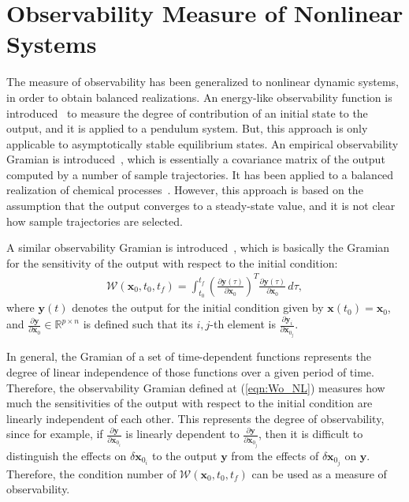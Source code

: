 \documentclass[letterpaper, preprint, paper,11pt]{AAS}	%
\newcommand{\parenth}[1]{\ensuremath{\left( #1 \right)}}
\newcommand{\refeqn}[1]{(\ref{eqn:#1})}
\newcommand{\deriv}[2]{\ensuremath{\frac{\partial #1}{\partial #2}}}
\renewcommand{\Re}{\ensuremath{\mathbb{R}}}
\newcommand{\x}{\ensuremath{\mathbf{x}}}
\newcommand{\y}{\mathbf{y}}
\begin{document}


\section{Observability Measure of Nonlinear Systems}

The measure of observability has been generalized to nonlinear dynamic systems, in order to obtain balanced realizations.
An energy-like observability function is introduced~\cite{SchSCL93,Sch94,NewKriPICDC98} to measure the degree of contribution of an initial state to the output, and it is applied to a pendulum system. But, this approach is only applicable to asymptotically stable equilibrium states. An empirical observability Gramian is introduced~\cite{LalMarPIWC99,LalMarIJRNC02}, which is essentially a covariance matrix of the output computed by a number of sample trajectories.
It has been applied to a balanced realization of chemical processes~\cite{HahEdgJPC03,HahEdgCCE02}. However, this approach is based on the assumption that the output converges to a steady-state value, and it is not clear how  sample trajectories are selected. 

A similar observability Gramian is introduced~\cite{KreIdePICDC09}, which is basically the Gramian for the sensitivity of the output with respect to the initial condition:
\begin{align}
\mathcal{W} (\x_0,t_0,t_f) = \int_{t_0}^{t_f} \parenth{\deriv{\y(\tau)}{\x_0}}^T\deriv{\y(\tau)}{\x_0}\,d\tau,\label{eqn:Wo_NL}
\end{align}
where $\y(t)$ denotes the output for the initial condition given by $\x(t_0)=\x_0$, and $\deriv{\y}{\x_0}\in\Re^{p\times n}$ is defined such that its $i,j$-th element is $\deriv{\y_i}{\x_{0_j}}$. 

In general, the Gramian of a set of time-dependent functions represents the degree of linear independence of those functions over a given period of time. Therefore, the observability Gramian defined at \refeqn{Wo_NL} measures how much the sensitivities of the output with respect to the initial condition are linearly independent of each other. This represents the degree of observability, since for example, if $\deriv{\y}{\x_{0_i}}$ is linearly dependent to $\deriv{\y}{\x_{0_j}}$, then it is difficult to distinguish the effects on $\delta \x_{0_i}$ to the output $\y$ from the effects of $\delta \x_{0_j}$ on $\y$. Therefore, the condition number of $\mathcal{W} (\x_0,t_0,t_f)$ can be used as a measure of observability. 
\end{document}
